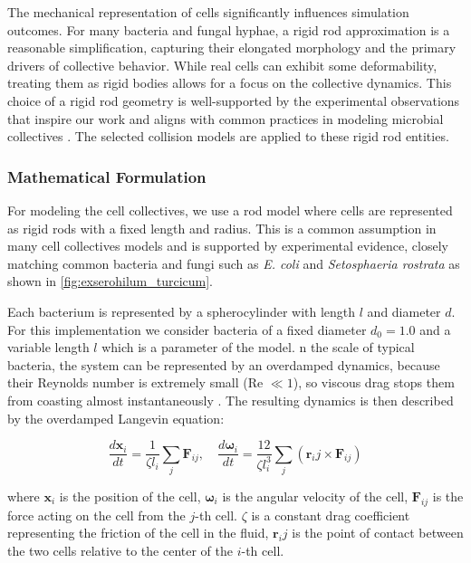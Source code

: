\documentclass[conference]{IEEEtran}
\begin{document}
The mechanical representation of cells significantly influences simulation outcomes. For many bacteria and fungal hyphae, a rigid rod approximation is a reasonable simplification, capturing their elongated morphology and the primary drivers of collective behavior. While real cells can exhibit some deformability, treating them as rigid bodies allows for a focus on the collective dynamics. This choice of a rigid rod geometry is well-supported by the experimental observations that inspire our work and aligns with common practices in modeling microbial collectives\cite{You2018}\cite{Weady2024}\cite{Blanchard2015}\cite{Warren2019}\cite{Ghosh2015}\cite{Khan_2024}\cite{Rudge2012} . The selected collision models are applied to these rigid rod entities.

\subsubsection{Mathematical Formulation}

For modeling the cell collectives, we use a rod model where cells are represented as rigid rods with a fixed length and radius. This is a common assumption in many cell collectives models \cite{You2018}\cite{Weady2024}\cite{Blanchard2015}\cite{Warren2019}\cite{Ghosh2015} and is supported by experimental evidence, closely matching common bacteria and fungi such as \textit{E. coli} and \textit{Setosphaeria rostrata} as shown in \autoref{fig:exserohilum_turcicum}.


Each bacterium is represented by a spherocylinder with length $l$ and diameter $d$. For this implementation we consider bacteria of a fixed diameter $d_0 = 1.0$ and a variable length $l$ which is a parameter of the model. n the scale of typical bacteria, the system can be represented by an overdamped dynamics, because their Reynolds number is extremely small (Re $\ll 1$), so viscous drag stops them from coasting almost instantaneously \cite{datta2024lifelowreynoldsnumber}. The resulting dynamics is then described by the overdamped Langevin equation:

$$
    \frac{d \mathbf{x}_i}{dt} = \frac{1}{\zeta l_i} \sum_j \mathbf{F}_{ij}, \quad \frac{d \mathbf{\omega}_i}{dt} = \frac{12}{\zeta l_i^3} \sum_j (\mathbf{r}_ij \times \mathbf{F}_{ij})
$$
\label{eq:overdamped_langevin}

where $\mathbf{x}_i$ is the position of the cell, $\mathbf{\omega}_i$ is the angular velocity of the cell, $\mathbf{F}_{ij}$ is the force acting on the cell from the $j$-th cell. $\zeta$ is a constant drag coefficient representing the friction of the cell in the fluid, $\mathbf{r}_ij$ is the point of contact between the two cells relative to the center of the $i$-th cell.
\end{document}
